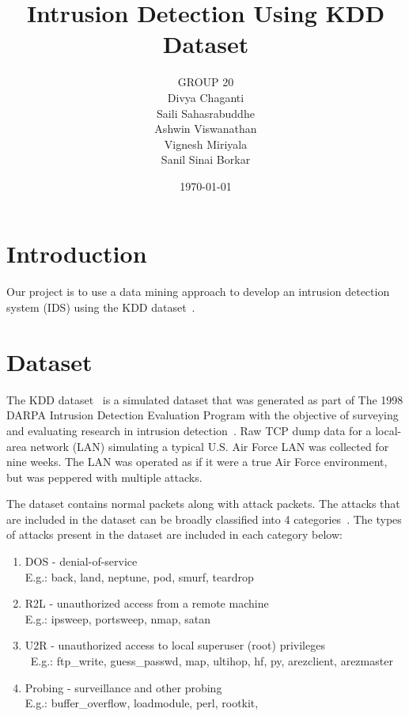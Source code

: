 \documentclass[11pt]{article}
\title{\textbf{Intrusion Detection Using KDD Dataset}}
\author{GROUP 20\\
		Divya Chaganti\\
		Saili Sahasrabuddhe\\
		Ashwin Viswanathan\\
		Vignesh Miriyala\\
		Sanil Sinai Borkar}
\date{\today}
\begin{document}
\maketitle

\section{Introduction}
\label{Sec:Introduction}
Our project is to use a data mining approach to develop an intrusion detection system (IDS) using the KDD dataset~\cite{kdddata}.

\section{Dataset}
\label{Sec:Dataset}
The KDD dataset~\cite{kdddata} is a simulated dataset that was generated as part of The 1998 DARPA Intrusion Detection Evaluation Program with the objective of surveying and evaluating research in intrusion detection~\cite{kddnames}. Raw TCP dump data for a local-area network (LAN) simulating a typical U.S. Air Force LAN was collected for nine weeks. The LAN was operated as if it were a true Air Force environment, but was peppered with multiple attacks.

The dataset contains normal packets along with attack packets. The attacks that are included in the dataset can be broadly classified into 4 categories~\cite{kddnames}. The types of attacks present in the dataset are included in each category below:
\begin{enumerate}
\item DOS - denial-of-service\\
E.g.: back, land, neptune, pod, smurf, teardrop
\item R2L - unauthorized access from a remote machine\\
E.g.: ipsweep, portsweep, nmap, satan
\item U2R - unauthorized access to local superuser (root) privileges\\\
E.g.: ftp\_write, guess\_passwd, map, ultihop, hf, py, arezclient, arezmaster
\item Probing - surveillance and other probing\\
E.g.: buffer\_overflow, loadmodule, perl, rootkit, 
\end{enumerate}
\end{document}
